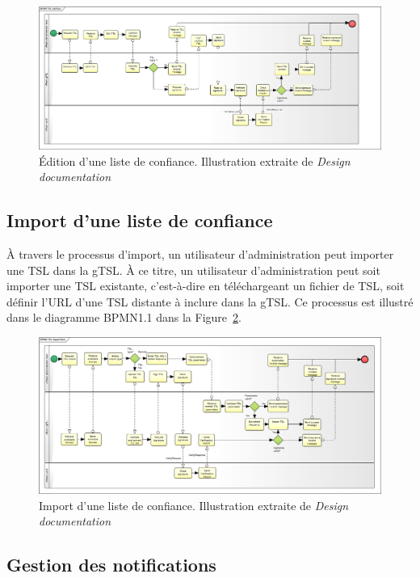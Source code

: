 \documentclass{tnreport}
\begin{document}
\begin{figure}[h]
	\centering
	\includegraphics[scale=0.3]{figures/edit-flow}
	\caption{Édition d'une liste de confiance. Illustration extraite de \textit{Design documentation}~\cite{design-document}}
	\label{fig:edit-flow}
\end{figure}

\subsection{Import d'une liste de confiance}

À travers le processus d'import, un utilisateur d'administration peut importer une TSL dans la gTSL. À ce titre, un utilisateur d'administration peut soit importer une TSL existante, c'est-à-dire en téléchargeant un fichier de TSL, soit définir l'URL d'une TSL distante à inclure dans la gTSL. Ce processus est illustré dans le diagramme BPMN1.1 dans la Figure~\ref{fig:import-flow}.

\begin{figure}[h]
	\centering
	\includegraphics[scale=0.31]{figures/import-flow}
	\caption{Import d'une liste de confiance. Illustration extraite de \textit{Design documentation}~\cite{design-document}}
	\label{fig:import-flow}
\end{figure}

\subsection{Gestion des notifications}
\end{document}
